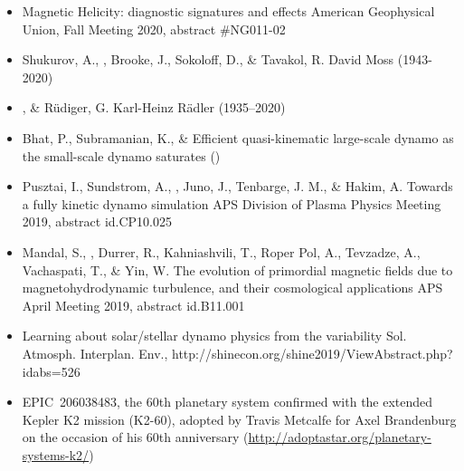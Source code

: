 \begin{itemize}
\item[{62.}~]
\Brandenburg{}
{Magnetic Helicity: diagnostic signatures and effects}
{American Geophysical Union, Fall Meeting 2020, abstract \#NG011-02}

\item[{61.}~]
Shukurov, A., \Brandenburg, Brooke, J., Sokoloff, D., \& Tavakol, R.
{David Moss (1943-2020)}

\item[{60.}~]
\Brandenburg, \& R\"udiger, G.
{Karl-Heinz R\"adler (1935--2020)}

\item[{59.}~]
Bhat, P., Subramanian, K., \& \Brandenburg{}
{Efficient quasi-kinematic large-scale dynamo as the small-scale dynamo saturates}
()

\item[{58.}~]
Pusztai, I., Sundstrom, A., \Brandenburg, Juno, J., Tenbarge, J. M., \& Hakim, A.
{Towards a fully kinetic dynamo simulation}
{APS Division of Plasma Physics Meeting 2019, abstract id.CP10.025}

\item[{57.}~]
Mandal, S., \Brandenburg, Durrer, R., Kahniashvili, T., Roper Pol, A., Tevzadze, A., Vachaspati, T., \& Yin, W.
{The evolution of primordial magnetic fields due to magnetohydrodynamic turbulence, and their cosmological applications}
{APS April Meeting 2019, abstract id.B11.001}

\item[{56.}~]
\Brandenburg{}
{Learning about solar/stellar dynamo physics from the variability}
{Sol. Atmosph. Interplan. Env., http://shinecon.org/shine2019/ViewAbstract.php?idabs=526}

\item[{55.}~]
EPIC~206038483, the 60th planetary system confirmed with the
extended Kepler K2 mission (K2-60), adopted by Travis Metcalfe
for Axel Brandenburg on the occasion of his 60th anniversary
(\url{http://adoptastar.org/planetary-systems-k2/})


\end{itemize}
